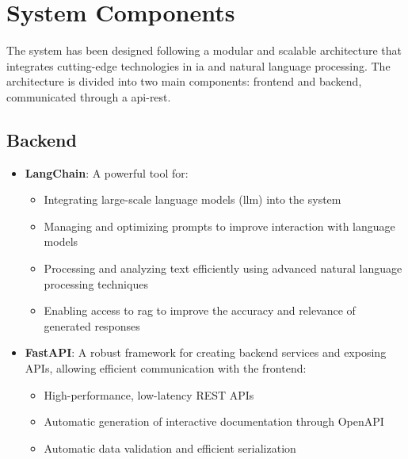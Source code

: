 \section{System Components}

The system has been designed following a modular and scalable architecture that integrates cutting-edge technologies in \gls{ia} and natural language processing. The architecture is divided into two main components: frontend and backend, communicated through a \gls{api-rest}.

\subsection{Backend}

\begin{itemize}
	\item \textbf{LangChain}: A powerful tool for:
	      \begin{itemize}
		      \item Integrating large-scale language models (\gls{llm}) into the system
		      \item Managing and optimizing prompts to improve interaction with language models
		      \item Processing and analyzing text efficiently using advanced natural language processing techniques
		      \item Enabling access to \gls{rag} to improve the accuracy and relevance of generated responses
	      \end{itemize}

	\item \textbf{FastAPI}: A robust framework for creating backend services and exposing APIs, allowing efficient communication with the frontend:
	      \begin{itemize}
		      \item High-performance, low-latency REST APIs
		      \item Automatic generation of interactive documentation through OpenAPI
		      \item Automatic data validation and efficient serialization
	      \end{itemize}
\end{itemize}

